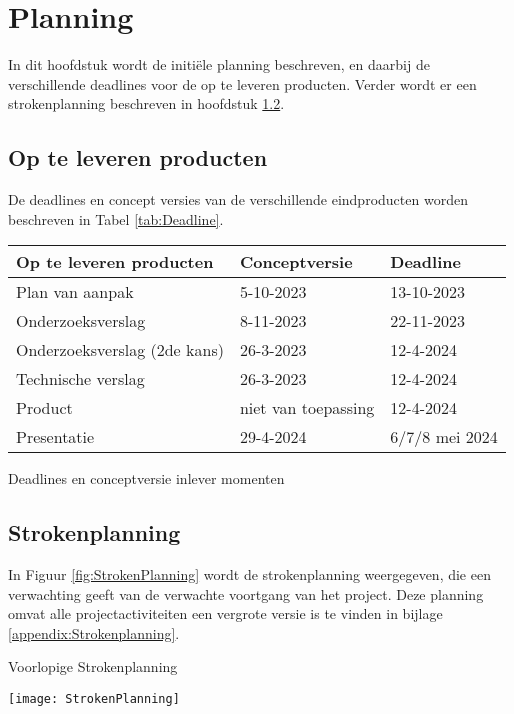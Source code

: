 \chapter{Planning}
In dit hoofdstuk wordt de initiële planning beschreven, en daarbij de verschillende deadlines voor de op te leveren producten.
Verder wordt er een strokenplanning beschreven in hoofdstuk \ref{sec:strokenplanning}.
\section{Op te leveren producten}
De deadlines en concept versies van de verschillende eindproducten worden beschreven in Tabel \ref{tab:Deadline}.

\whitespace[2]
\begin{graphic}
	\captionsetup{type=table}
	\begin{tabularx}{\textwidth}{|l|l|X|}
		\hline
		\textbf{Op te leveren producten} & \textbf{Conceptversie} & \textbf{Deadline}        \\
		\hline
		Plan van aanpak                  & 5-10-2023              & 13-10-2023               \\
		\hline
		Onderzoeksverslag                & 8-11-2023              & 22-11-2023               \\
		\hline
		Onderzoeksverslag (2de kans)     & 26-3-2023              & 12-4-2024                 \\
		\hline
		Technische verslag               & 26-3-2023              & 12-4-2024                 \\
		\hline
		Product                          & niet van toepassing    & 12-4-2024                 \\
		\hline
		Presentatie                      & 29-4-2024              & 6/7/8 mei 2024 \\
		\hline
	\end{tabularx}
	\caption{Deadlines en conceptversie inlever momenten}
	\label{tab:Deadline}
	\vspace{0.2cm}
\end{graphic}
\section{Strokenplanning}
\label{sec:strokenplanning}
In Figuur \ref{fig:StrokenPlanning} wordt de strokenplanning weergegeven, die een verwachting geeft van de verwachte voortgang van het project.
Deze planning omvat alle projectactiviteiten een vergrote versie is te vinden in bijlage \ref{appendix:Strokenplanning}.

\whitespace[2]
\begin{graphic}
	\captionsetup{type=figure}
	\caption{Voorlopige Strokenplanning}
	\texttt{[image: StrokenPlanning]}
	\label{fig:StrokenPlanning}
\end{graphic}
